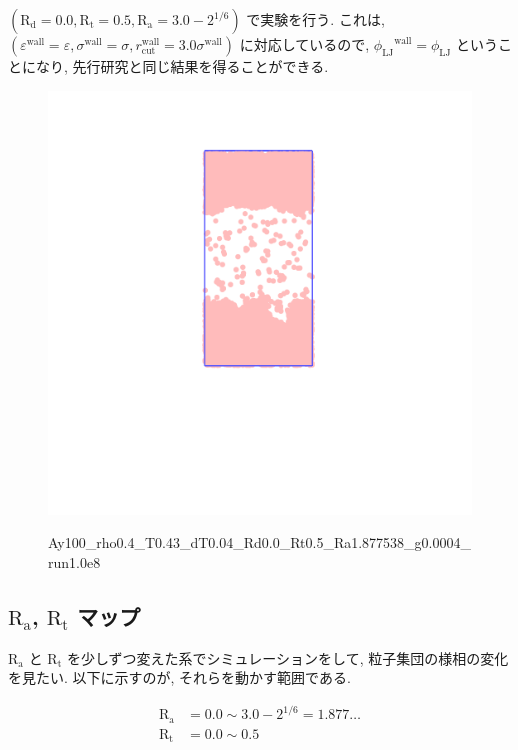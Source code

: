 $(\text{R}_\text{d} = 0.0, \text{R}_\text{t} = 0.5, \text{R}_\text{a} = 3.0 - 2^{1/6})$ で実験を行う. これは, $(\varepsilon^{\text{wall}} = \varepsilon, \sigma^{\text{wall}} = \sigma, r^{\text{wall}}_{\text{cut}} = 3.0 \sigma^{\text{wall}})$ に対応しているので, ${\phi_{\text{LJ}}}^{\text{wall}} = \phi_{\text{LJ}}$ ということになり, 先行研究と同じ結果を得ることができる.

\begin{figure}[H]
  \centering
  \href{https://youtu.be/CIEyUPvPY6A}{\includegraphics[scale=0.2]{image/2023-11-21T21:01:17.543_followup_chi1.265_Ay100_rho0.4_T0.43_dT0.04_Rd0.0_Rt0.5_Ra1.877538_g0.00019998593898298055_run1.0e8_output.png}}
  \caption{Ay100\_rho0.4\_T0.43\_dT0.04\_Rd0.0\_Rt0.5\_Ra1.877538\_g0.0004\_run1.0e8}
  \label{}
\end{figure}


\subsection{$\text{R}_\text{a}$, $\text{R}_\text{t}$ マップ}

$\text{R}_\text{a}$ と $\text{R}_\text{t}$ を少しずつ変えた系でシミュレーションをして, 粒子集団の様相の変化を見たい. 以下に示すのが, それらを動かす範囲である.

\begin{align}
  \text{R}_\text{a} &= 0.0 \sim 3.0 - 2^{1/6} = 1.877\dots \\
  \text{R}_\text{t} &= 0.0 \sim 0.5
\end{align}

